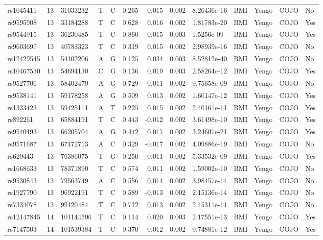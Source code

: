 \documentclass[11pt,twoside]{bristolthesis}
\begin{document}
\begin{longtable}[t]{lrlllrrrlllll}
rs1045411 & 13 & 31033232 & T & C & 0.265 & -0.015 & 0.002 & 8.26436e-16 & BMI & Yengo & COJO & No\\
rs9595908 & 13 & 33184288 & T & C & 0.628 & 0.016 & 0.002 & 1.81783e-20 & BMI & Yengo & COJO & Yes\\
rs9544915 & 13 & 36230485 & T & C & 0.860 & 0.015 & 0.003 & 1.5256e-09 & BMI & Yengo & COJO & Yes\\
\addlinespace
rs9603697 & 13 & 40783323 & T & C & 0.319 & 0.015 & 0.002 & 2.98939e-16 & BMI & Yengo & COJO & No\\
rs12429545 & 13 & 54102206 & A & G & 0.125 & 0.034 & 0.003 & 8.52812e-40 & BMI & Yengo & COJO & No\\
rs10467530 & 13 & 54694130 & C & G & 0.136 & 0.019 & 0.003 & 2.58264e-12 & BMI & Yengo & COJO & Yes\\
rs9527706 & 13 & 58402479 & A & G & 0.729 & -0.011 & 0.002 & 9.75658e-09 & BMI & Yengo & COJO & No\\
rs9538141 & 13 & 59178258 & A & G & 0.509 & 0.013 & 0.002 & 1.60147e-12 & BMI & Yengo & COJO & Yes\\
\addlinespace
rs1333423 & 13 & 59425111 & A & T & 0.225 & 0.015 & 0.002 & 2.40161e-11 & BMI & Yengo & COJO & Yes\\
rs892261 & 13 & 65884191 & T & C & 0.443 & -0.012 & 0.002 & 3.61498e-10 & BMI & Yengo & COJO & Yes\\
rs9540493 & 13 & 66205704 & A & G & 0.442 & 0.017 & 0.002 & 3.24607e-21 & BMI & Yengo & COJO & Yes\\
rs9571687 & 13 & 67472713 & A & C & 0.329 & -0.017 & 0.002 & 4.09886e-19 & BMI & Yengo & COJO & No\\
rs629443 & 13 & 76386075 & T & G & 0.250 & 0.011 & 0.002 & 5.33532e-09 & BMI & Yengo & COJO & Yes\\
\addlinespace
rs1668633 & 13 & 78371890 & T & C & 0.574 & 0.011 & 0.002 & 1.59002e-10 & BMI & Yengo & COJO & No\\
rs9530843 & 13 & 79563749 & A & C & 0.556 & 0.014 & 0.002 & 3.98457e-14 & BMI & Yengo & COJO & No\\
rs1927790 & 13 & 96922191 & T & C & 0.589 & -0.013 & 0.002 & 2.15136e-14 & BMI & Yengo & COJO & No\\
rs7334078 & 13 & 99120484 & T & C & 0.712 & 0.013 & 0.002 & 2.45311e-11 & BMI & Yengo & COJO & No\\
rs12147845 & 14 & 101144596 & T & C & 0.114 & 0.020 & 0.003 & 2.17551e-13 & BMI & Yengo & COJO & Yes\\
\addlinespace
rs7147503 & 14 & 101539384 & T & C & 0.370 & -0.012 & 0.002 & 9.74881e-12 & BMI & Yengo & COJO & Yes\\

\end{longtable}
\end{document}
